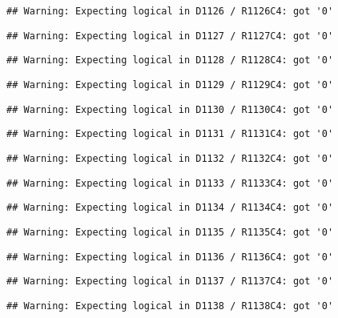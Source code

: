 \documentclass[
]{article}
\begin{document}
\begin{verbatim}
## Warning: Expecting logical in D1126 / R1126C4: got '0'
\end{verbatim}

\begin{verbatim}
## Warning: Expecting logical in D1127 / R1127C4: got '0'
\end{verbatim}

\begin{verbatim}
## Warning: Expecting logical in D1128 / R1128C4: got '0'
\end{verbatim}

\begin{verbatim}
## Warning: Expecting logical in D1129 / R1129C4: got '0'
\end{verbatim}

\begin{verbatim}
## Warning: Expecting logical in D1130 / R1130C4: got '0'
\end{verbatim}

\begin{verbatim}
## Warning: Expecting logical in D1131 / R1131C4: got '0'
\end{verbatim}

\begin{verbatim}
## Warning: Expecting logical in D1132 / R1132C4: got '0'
\end{verbatim}

\begin{verbatim}
## Warning: Expecting logical in D1133 / R1133C4: got '0'
\end{verbatim}

\begin{verbatim}
## Warning: Expecting logical in D1134 / R1134C4: got '0'
\end{verbatim}

\begin{verbatim}
## Warning: Expecting logical in D1135 / R1135C4: got '0'
\end{verbatim}

\begin{verbatim}
## Warning: Expecting logical in D1136 / R1136C4: got '0'
\end{verbatim}

\begin{verbatim}
## Warning: Expecting logical in D1137 / R1137C4: got '0'
\end{verbatim}

\begin{verbatim}
## Warning: Expecting logical in D1138 / R1138C4: got '0'
\end{verbatim}
\end{document}
